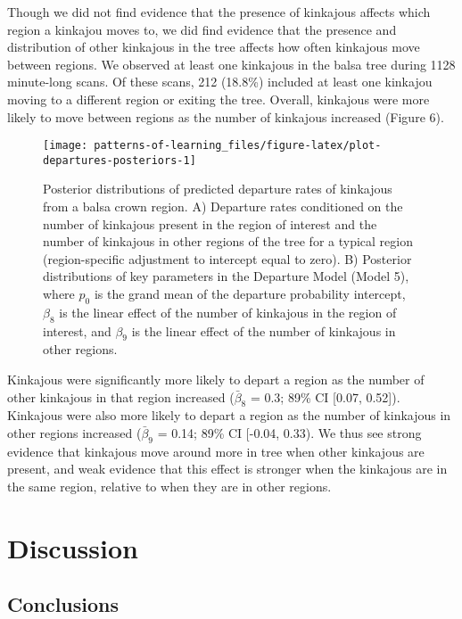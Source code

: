 \documentclass[twoside,12pt,final]{ucthesis-CA2012}
\begin{document}
\begin{ucmainmatter}
Though we did not find evidence that the presence of kinkajous affects which region a kinkajou moves to, we did find evidence that the presence and distribution of other kinkajous in the tree affects how often kinkajous move between regions. We observed at least one kinkajous in the balsa tree during 1128 minute-long scans. Of these scans, 212 (18.8\%) included at least one kinkajou moving to a different region or exiting the tree. Overall, kinkajous were more likely to move between regions as the number of kinkajous increased (Figure 6).
\begin{figure}
\texttt{[image: patterns-of-learning\_files/figure-latex/plot-departures-posteriors-1]} \caption[Posterior distributions of predicted departure rates]{Posterior distributions of predicted departure rates of kinkajous from a balsa crown region. A) Departure rates conditioned on the number of kinkajous present in the region of interest and the number of kinkajous in other regions of the tree for a typical region (region-specific adjustment to intercept equal to zero). B) Posterior distributions of key parameters in the Departure Model (Model 5), where $p_0$ is the grand mean of the departure probability intercept, $\beta_8$ is the linear effect of the number of kinkajous in the region of interest, and $\beta_9$ is the linear effect of the number of kinkajous in other regions.}\label{fig:plot-departures-posteriors}
\end{figure}
Kinkajous were significantly more likely to depart a region as the number of other kinkajous in that region increased (\(\bar\beta_8\) = 0.3; 89\% CI {[}0.07, 0.52{]}). Kinkajous were also more likely to depart a region as the number of kinkajous in other regions increased (\(\bar\beta_9\) = 0.14; 89\% CI {[}-0.04, 0.33). We thus see strong evidence that kinkajous move around more in tree when other kinkajous are present, and weak evidence that this effect is stronger when the kinkajous are in the same region, relative to when they are in other regions.

\hypertarget{discussion-1}{%
\section{Discussion}\label{discussion-1}}

\hypertarget{conclusions}{%
\subsection{Conclusions}\label{conclusions}}


\end{ucmainmatter}
\end{document}
